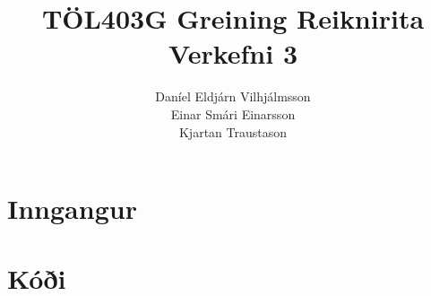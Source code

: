 \documentclass[a4paper]{article}
\begin{document}
\title{
  TÖL403G Greining Reiknirita \\
  Verkefni 3 }

\author{
  Daníel Eldjárn Vilhjálmsson \\
  Einar Smári Einarsson       \\
  Kjartan Traustason }

\maketitle
\section*{Inngangur} %
\label{sec:inng}


\section*{Kóði} %
\label{sec:kodi}
\end{document}
